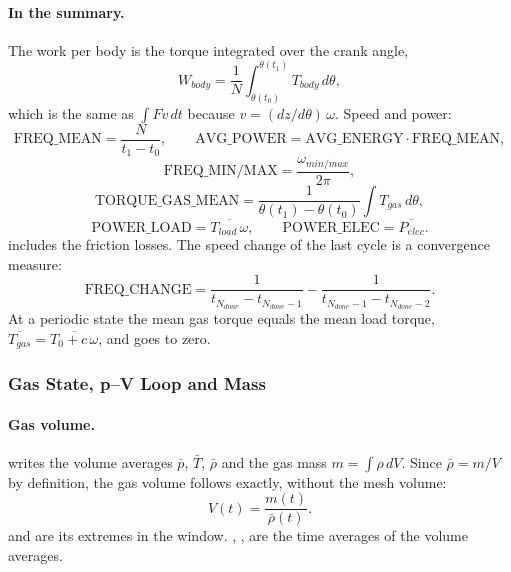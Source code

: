 \paragraph{In the summary.}
The work per body is the torque integrated over the crank angle,
\begin{equation}
W_{body} = \frac{1}{N}\int_{\theta(t_0)}^{\theta(t_1)} T_{body}\, d\theta ,
\end{equation}
which is the same as $\int F v\,dt$ because $v = (dz/d\theta)\,\omega$. Speed and power:
\begin{equation}
\mathrm{FREQ\_MEAN} = \frac{N}{t_1 - t_0}, \qquad \mathrm{AVG\_POWER} = \mathrm{AVG\_ENERGY}\cdot \mathrm{FREQ\_MEAN},
\end{equation}
\begin{equation}
\mathrm{FREQ\_MIN/MAX} = \frac{\omega_{min/max}}{2\pi} ,
\end{equation}
\begin{equation}
\mathrm{TORQUE\_GAS\_MEAN} = \frac{1}{\theta(t_1) - \theta(t_0)}\int T_{gas}\,d\theta ,
\end{equation}
\begin{equation}
\mathrm{POWER\_LOAD} = \overline{T_{load}\,\omega}, \qquad \mathrm{POWER\_ELEC} = \overline{P_{elec}} .
\end{equation}
 includes the friction losses. The speed change of the last cycle is a convergence measure:
\begin{equation}
\mathrm{FREQ\_CHANGE} = \frac{1}{t_{N_{done}} - t_{N_{done}-1}} - \frac{1}{t_{N_{done}-1} - t_{N_{done}-2}} .
\end{equation}
At a periodic state the mean gas torque equals the mean load torque, $\overline{T_{gas}} = \overline{T_0 + c\,\omega}$, and  goes to zero.

\subsubsection{Gas State, p--V Loop and Mass}
\paragraph{Gas volume.}
 writes the volume averages $\bar{p}$, $\bar{T}$, $\bar{\rho}$ and  the gas mass $m = \int \rho\, dV$. Since $\bar{\rho} = m/V$ by definition, the gas volume follows exactly, without the mesh volume:
\begin{equation}
V(t) = \frac{m(t)}{\bar{\rho}(t)} .
\end{equation}
 and  are its extremes in the window. , ,  are the time averages of the volume averages.


